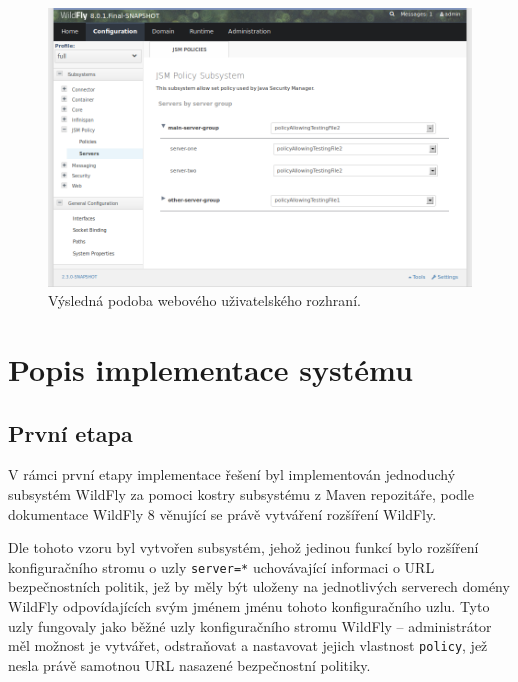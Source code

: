 \begin{figure}[ht]
  \centering
  \includegraphics[width=14cm]{fig/jsmpolicy-servers}
  \caption{Výsledná podoba webového uživatelského rozhraní.}
\end{figure}

\chapter{Popis implementace systému} \label{implementace}

\section{První etapa}

V rámci první etapy implementace řešení byl implementován jednoduchý subsystém WildFly za pomoci kostry subsystému z Maven repozitáře, podle dokumentace WildFly 8 věnující se právě vytváření rozšíření WildFly. \cite{WildFlyExtending}

Dle tohoto vzoru byl vytvořen subsystém, jehož jedinou funkcí bylo rozšíření konfiguračního stromu o uzly {\tt server=*} uchovávající informaci o URL bezpečnostních politik, jež by měly být uloženy na jednotlivých serverech domény WildFly odpovídajících svým jménem jménu tohoto konfiguračního uzlu. Tyto uzly fungovaly jako běžné uzly konfiguračního stromu WildFly -- administrátor měl možnost je vytvářet, odstraňovat a nastavovat jejich vlastnost {\tt policy}, jež nesla právě samotnou URL nasazené bezpečnostní politiky.

